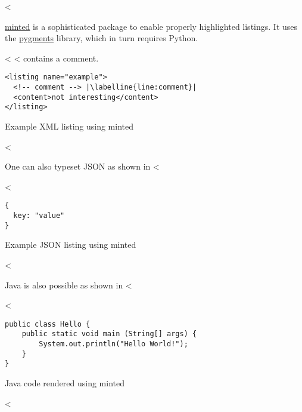 <%

\href{https://github.com/gpoore/minted}{minted} is a sophisticated package to enable properly highlighted listings.
It uses the \href{http://pygments.org/}{pygments} library, which in turn requires Python.

<%
<%
 contains a comment.

\begin{listing}[htbp]
    \begin{verbatim}
<listing name="example">
  <!-- comment --> |\labelline{line:comment}|
  <content>not interesting</content>
</listing>
\end{verbatim}
  \caption{Example XML listing using minted}
  \label{lst:XML}
\end{listing}
<%

One can also typeset JSON as shown in <%

<%
\begin{listing}[htbp]
    \begin{verbatim}
{
  key: "value"
}
\end{verbatim}
  \caption{Example JSON listing using minted}
  \label{lst:flJSON}
\end{listing}
<%

Java is also possible as shown in <%

<%
\begin{listing}[htbp]
    \begin{verbatim}
public class Hello {
    public static void main (String[] args) {
        System.out.println("Hello World!");
    }
}
\end{verbatim}
  \caption{Java code rendered using minted}
  \label{lst:java}
\end{listing}
<%
